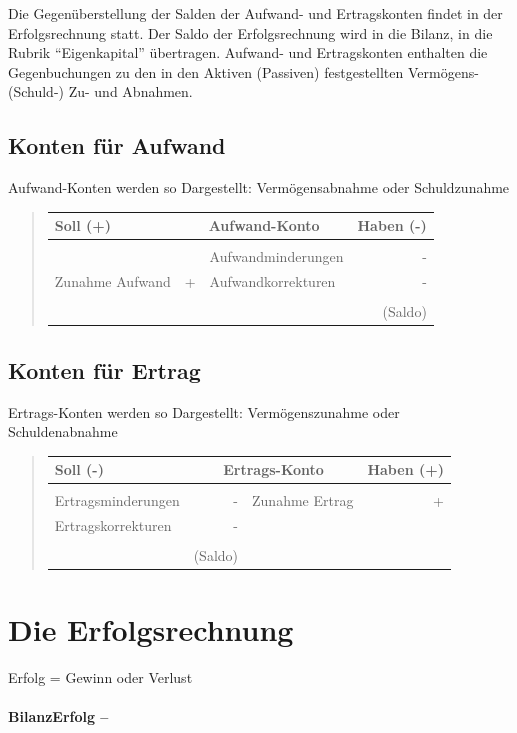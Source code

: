 Die Gegenüberstellung der Salden der Aufwand- und Ertragskonten findet
in der Erfolgsrechnung statt. Der Saldo der Erfolgsrechnung wird in
die Bilanz, in die Rubrik ``Eigenkapital'' übertragen. Aufwand-
und Ertragskonten enthalten die Gegenbuchungen zu den in den Aktiven
(Passiven) festgestellten Vermögens-(Schuld-) Zu- und Abnahmen.




\subsection*{Konten für Aufwand}

Aufwand-Konten werden so Dargestellt: Vermögensabnahme oder Schuldzunahme
\begin{verse}
\begin{tabular}{lr|lr}
Soll (+) & \multicolumn{2}{c}{\textbf{Aufwand-Konto}} & Haben (-)\tabularnewline
\hline 
 &  &  & \tabularnewline
 &  & Aufwandminderungen & -\tabularnewline
Zunahme Aufwand & + & Aufwandkorrekturen & -\tabularnewline
 &  &  & \tabularnewline
 &  &  & (Saldo)\tabularnewline
\end{tabular}
\end{verse}

\subsection*{Konten für Ertrag}

Ertrags-Konten werden so Dargestellt: Vermögenszunahme oder Schuldenabnahme
\begin{verse}
\begin{tabular}{lr|lr}
Soll (-) & \multicolumn{2}{c}{\textbf{Ertrags-Konto}} & Haben (+)\tabularnewline
\hline 
 &  &  & \tabularnewline
Ertragsminderungen & - & Zunahme Ertrag & +\tabularnewline
Ertragskorrekturen & - &  & \tabularnewline
 &  &  & \tabularnewline
 & (Saldo) &  & \tabularnewline
\end{tabular}
\end{verse}

\section*{Die Erfolgsrechnung}

Erfolg = Gewinn oder Verlust


\paragraph*{BilanzErfolg --}

